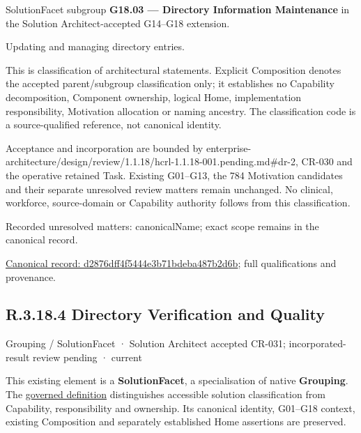 SolutionFacet subgroup \textbf{G18.03 — Directory Information Maintenance} in the Solution Architect-accepted G14–G18 extension.



Updating and managing directory entries.



This is classification of architectural statements. Explicit Composition denotes the accepted parent/subgroup classification only; it establishes no Capability decomposition, Component ownership, logical Home, implementation responsibility, Motivation allocation or naming ancestry. The classification code is a source-qualified reference, not canonical identity.



Acceptance and incorporation are bounded by enterprise-architecture/design/review/1.1.18/hcrl-1.1.18-001.pending.md\#dr-2, CR-030 and the operative retained Task. Existing G01–G13, the 784 Motivation candidates and their separate unresolved review matters remain unchanged. No clinical, workforce, source-domain or Capability authority follows from this classification.


{\small Recorded unresolved matters: canonicalName; exact scope remains in the canonical record.}\par
{\footnotesize \href{../../../../../../../continuum/grouping/d2876dff4f5444e3b71bdeba487b2d6b.md}{Canonical record: d2876dff4f5444e3b71bdeba487b2d6b}; full qualifications and provenance.}\par
\subsection*{R.3.18.4 Directory Verification and Quality}
\label{navigation:R.3.18.4}

\label{element:7b2cabb4089d414d8ad700ef5f7932b7}
{\small Grouping / SolutionFacet · Solution Architect accepted CR-031; incorporated-result review pending · current}\par

This existing element is a \textbf{SolutionFacet}, a specialisation of native
\textbf{Grouping}. The \href{\detokenize{../../../../../../../governance/continuum-representation.md#solutionfacet-classification--1119-candidate}}{governed definition}
distinguishes accessible solution classification from Capability, responsibility
and ownership. Its canonical identity, G01–G18 context, existing Composition
and separately established Home assertions are preserved.



